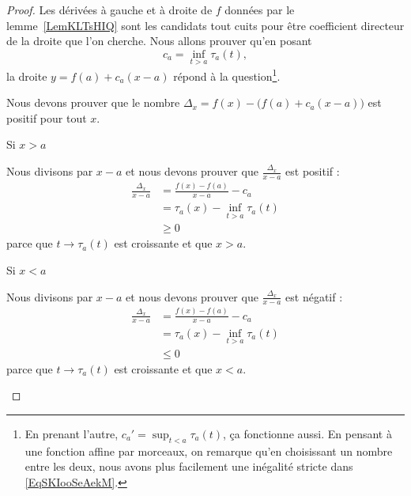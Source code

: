 \begin{proof}
    Les dérivées à gauche et à droite de \( f\) données par le lemme~\ref{LemKLTsHIQ} sont les candidats tout cuits pour être coefficient directeur de la droite que l'on cherche. Nous allons prouver qu'en posant
    \begin{equation}
        c_a=\inf_{t>a}\tau_a(t),
    \end{equation}
    la droite \( y=f(a)+c_a(x-a)\) répond à la question\footnote{En prenant l'autre, $c_a'=\sup_{t<a}\tau_a(t)$, ça fonctionne aussi. En pensant à une fonction affine par morceaux, on remarque qu'en choisissant un nombre entre les deux, nous avons plus facilement une inégalité stricte dans \eqref{EqSKIooSeAekM}.}.

    Nous devons prouver que le nombre \( \Delta_x=f(x)-\big( f(a)+c_a(x-a) \big)\) est positif pour tout \( x\).
    \begin{subproof}

    \item[Si \( x>a\)]

        Nous divisons par \( x-a\) et nous devons prouver que \( \frac{ \Delta_x }{ x-a }\) est positif :
        \begin{subequations}
            \begin{align}
                \frac{ \Delta_x }{ x-a }&=\frac{ f(x)-f(a) }{ x-a }-c_a\\
                &=\tau_a(x)-\inf_{t>a}\tau_a(t)\\
                &\geq 0
            \end{align}
        \end{subequations}
        parce que \( t\to\tau_a(t)\) est croissante et que \( x>a\).

    \item[Si \( x<a\)]

        Nous divisons par \( x-a\) et nous devons prouver que \( \frac{ \Delta_x }{ x-a }\) est négatif :
        \begin{subequations}
            \begin{align}
                \frac{ \Delta_x }{ x-a }&=\frac{ f(x)-f(a) }{ x-a }-c_a\\
                &=\tau_a(x)-\inf_{t>a}\tau_a(t)\\
                &\leq 0
            \end{align}
        \end{subequations}
        parce que \( t\to\tau_a(t)\) est croissante et que \( x<a\).
    \end{subproof}
\end{proof}


